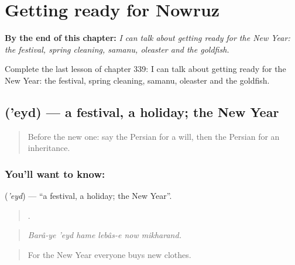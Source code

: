 
\chapter{Getting ready for Nowruz}
\label{ch:fa-getting-ready-for-nowruz}

\begin{chapteropening}
\textbf{By the end of this chapter:} \emph{I can talk about getting ready for the New Year: the festival, spring cleaning, samanu, oleaster and the goldfish.}

Complete the last lesson of chapter 339: I can talk about getting ready for the New Year: the festival, spring cleaning, samanu, oleaster and the goldfish.
\end{chapteropening}

\section[\texorpdfstring{\fa{عید} ('eyd)}{عید ('eyd)}]{ ('eyd) — a festival, a holiday; the New Year}

\label{lesson:FA-C339-eyd}



\begin{quote}
Before the new one: say the Persian for a will, then the Persian for an inheritance.
\end{quote}

\subsection*{You'll want to know: }
\textbf{} (\emph{'eyd}) — \textquotedblleft{}a festival, a holiday; the New Year\textquotedblright{}.

\begin{quote}
     .
\end{quote}

\begin{quote}
\emph{Barâ-ye 'eyd hame lebâs-e now mikharand.}
\end{quote}

\begin{quote}
For the New Year everyone buys new clothes.
\end{quote}

